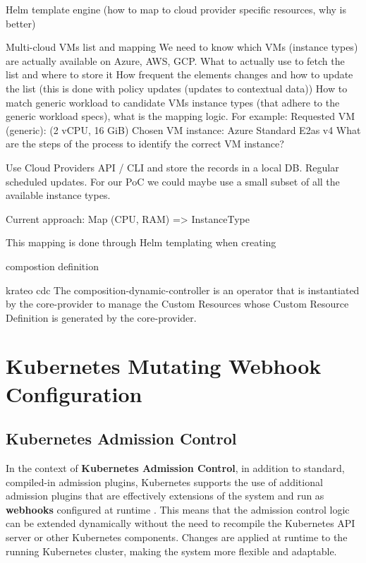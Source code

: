 Helm template engine (how to map to cloud provider specific resources, why is better)


Multi-cloud VMs list and mapping
We need to know which VMs (instance types) are actually available on Azure, AWS, GCP.
What to actually use to fetch the list and where to store it
How frequent the elements changes and how to update the list (this is done with policy updates (updates to contextual data))
How to match generic workload to candidate VMs instance types (that adhere to the generic workload specs), what is the mapping logic.
For example:
Requested VM (generic): (2 vCPU, 16 GiB)
Chosen VM instance: Azure Standard E2as v4
What are the steps of the process to identify the correct VM instance?

Use Cloud Providers API / CLI and store the records in a local DB. Regular scheduled updates.
For our PoC we could maybe use a small subset of all the available instance types.

Current approach:
Map (CPU, RAM) => InstanceType

This mapping is done through Helm templating when creating 

compostion definition


krateo cdc
The composition-dynamic-controller is an operator that is instantiated by the core-provider to manage the Custom Resources whose Custom Resource Definition is generated by the core-provider.

\section{Kubernetes Mutating Webhook Configuration}

\subsection{Kubernetes Admission Control}

In the context of \textbf{Kubernetes Admission Control}, in addition to standard, compiled-in admission plugins, Kubernetes supports the use of additional admission plugins that are effectively extensions of the system and run as \textbf{webhooks} configured at runtime \cite{kubernetes_dynamic_admission_control}. This means that the admission control logic can be extended dynamically without the need to recompile the Kubernetes API server or other Kubernetes components. Changes are applied at runtime to the running Kubernetes cluster, making the system more flexible and adaptable.











